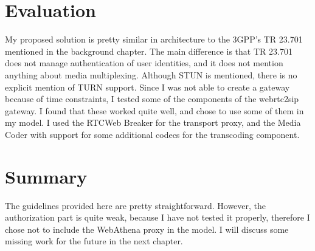 \section{Evaluation}
My proposed solution is pretty similar in architecture to the 3GPP's TR 23.701\cite{3gpp-wrtc-access-ims} mentioned in the background chapter. The main difference is that TR 23.701 does not manage authentication of user identities, and it does not mention anything about media multiplexing. Although STUN is mentioned, there is no explicit mention of TURN support. Since I was not able to create a gateway because of time constraints, I tested some of the components of the webrtc2sip gateway. I found that these worked quite well, and chose to use some of them in my model. I used the RTCWeb Breaker for the transport proxy, and the Media Coder with support for some additional codecs for the transcoding component.

\section{Summary}
The guidelines provided here are pretty straightforward. However, the authorization part is quite weak, because I have not tested it properly, therefore I chose not to include the WebAthena proxy in the model. I will discuss some missing work for the future in the next chapter. 